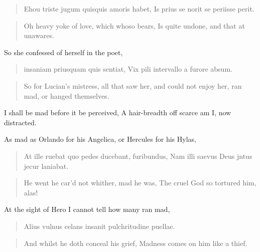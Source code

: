 \begin{latin}
\begin{verse}
Ehou triste jugum quisquis amoris habet,
Is prius se norit se periisse perit.
\end{verse}
\end{latin}
\translationrule%
\begin{verse}%
Oh heavy yoke of love, which whoso bears,
Is quite undone, and that at unawares.
\end{verse}%

So she confessed of herself in the poet,

\begin{latin}
\begin{verse}
insaniam priusquam quis sentiat,
Vix pili intervallo a furore absum.
\end{verse}
\end{latin}
\translationrule%
\begin{verse}%
So for Lucian's mistress, all that saw her,
and could not enjoy her, ran mad, or hanged themselves.
\end{verse}%

I shall be mad before it be perceived,
A hair-breadth off scarce am I, now distracted.

As mad as Orlando for his Angelica, or Hercules for his Hylas,

\begin{latin}
\begin{verse}
At ille ruebat quo pedes ducebant, furibundus,
Nam illi saevus Deus jntus jecur laniabat.
\end{verse}
\end{latin}
\translationrule%
\begin{verse}%
He went he car'd not whither, mad he was,
The cruel God so tortured him, alas!
\end{verse}%

At the sight of Hero I cannot tell how many ran mad,

\begin{latin}
\begin{verse}
Alius vulnus celans insanit pulchritudine puellae.
\end{verse}
\end{latin}
\translationrule%
\begin{verse}%
And whilst he doth conceal his grief,
Madness comes on him like a thief.
\end{verse}%


